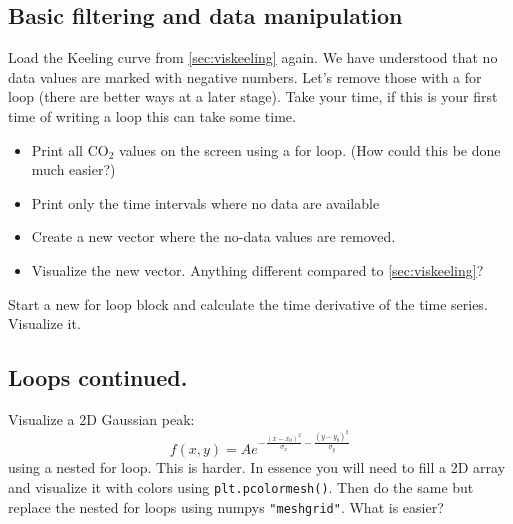 \subsection{Basic filtering and data manipulation}
\label{sec:loops}
Load the Keeling curve from \ref{sec:viskeeling} again. We have understood that no data values are marked with negative numbers. Let's remove those with a for loop (there are better ways at a later stage). Take your time, if this is your first time of writing a loop this can take some time.
\begin{itemize}
  \item Print all CO$_2$ values on the screen using a for loop. (How could this be done much easier?)
  \item Print only the time intervals where no data are available
  \item Create a new vector where the no-data values are removed.
  \item Visualize the new vector. Anything different compared to \ref{sec:viskeeling}?
\end{itemize}
Start a new for loop block and calculate the time derivative of the time series. Visualize it. 

\subsection{Loops continued.}
Visualize a 2D Gaussian peak:
$$
f(x,y) = Ae^{-\frac{(x-x_0)^2}{\sigma_x}-\frac{(y-y_0)^2}{\sigma_y}}
$$
using a nested for loop. This is harder. In essence you will need to fill a 2D array and visualize it with colors using \verb|plt.pcolormesh()|. Then do the same but replace the nested for loops using numpys \verb|"meshgrid"|. What is easier?
